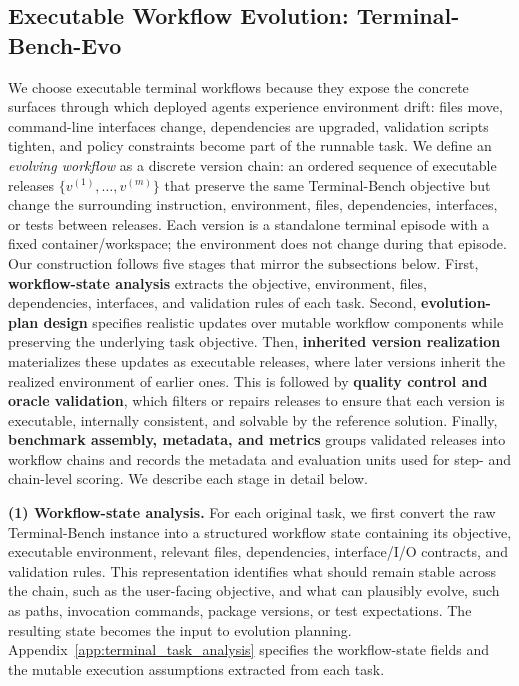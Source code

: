 \documentclass{article}
\begin{document}
\subsection{Executable Workflow Evolution: Terminal-Bench-Evo}
\label{sec:terminal_bench_evo}

We choose executable terminal workflows because they expose the concrete surfaces through which deployed agents experience environment drift: files move, command-line interfaces change, dependencies are upgraded, validation scripts tighten, and policy constraints become part of the runnable task. We define an \emph{evolving workflow} as a discrete version chain: an ordered sequence of executable releases $\{v^{(1)}, \ldots, v^{(m)}\}$ that preserve the same Terminal-Bench objective \cite{terminal-bench} but change the surrounding instruction, environment, files, dependencies, interfaces, or tests between releases. Each version is a standalone terminal episode with a fixed container/workspace; the environment does not change during that episode. 
Our construction follows five stages that mirror the subsections below. First, \textbf{workflow-state analysis} extracts the objective, environment, files, dependencies, interfaces, and validation rules of each task. Second, \textbf{evolution-plan design} specifies realistic updates over mutable workflow components while preserving the underlying task objective. Then, \textbf{inherited version realization} materializes these updates as executable releases, where later versions inherit the realized environment of earlier ones. This is followed by \textbf{quality control and oracle validation}, which filters or repairs releases to ensure that each version is executable, internally consistent, and solvable by the reference solution. Finally, \textbf{benchmark assembly, metadata, and metrics} groups validated releases into workflow chains and records the metadata and evaluation units used for step- and chain-level scoring.
We describe each stage in detail below.






\textbf{(1) Workflow-state analysis.} \noindent
For each original task, we first convert the raw Terminal-Bench instance into a structured workflow state containing its objective, executable environment, relevant files, dependencies, interface/I/O contracts, and validation rules. This representation identifies what should remain stable across the chain, such as the user-facing objective, and what can plausibly evolve, such as paths, invocation commands, package versions, or test expectations. The resulting state becomes the input to evolution planning. Appendix~\ref{app:terminal_task_analysis} specifies the workflow-state fields and the mutable execution assumptions extracted from each task.
\end{document}
